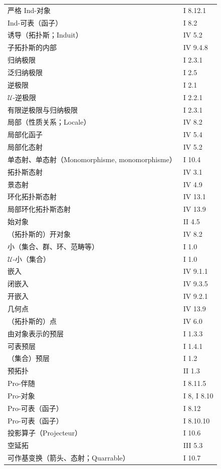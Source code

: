 \begin{longtable}{@{}p{}p{}@{}}
严格 Ind-对象 & I 8.12.1\\
Ind-可表（函子） & I 8.2\\
诱导（拓扑斯；Induit） & IV 5.2\\
子拓扑斯的内部 & IV 9.4.8\\[3pt]
归纳极限 & I 2.3.1\\
泛归纳极限 & I 2.5\\
逆极限 & I 2.1\\
$\mathcal U$-逆极限 & I 2.2.1\\
有限逆极限与归纳极限 & I 2.3.1\\
局部（性质关系；Locale） & IV 8.2\\
局部化函子 & IV 5.4\\
局部化态射 & IV 5.2\\
单态射、单态射（Monomorphisme, monomorphisme） & I 10.4\\
拓扑斯态射 & IV 3.1\\
景态射 & IV 4.9\\
环化拓扑斯态射 & IV 13.1\\
局部环化拓扑斯态射 & IV 13.9\\[3pt]
始对象 & II 4.5\\
（拓扑斯的）开对象 & IV 8.2\\[3pt]
小（集合、群、环、范畴等） & I 1.0\\
$\mathcal U$-小（集合） & I 1.0\\
嵌入 & IV 9.1.1\\
闭嵌入 & IV 9.3.5\\
开嵌入 & IV 9.2.1\\
几何点 & IV 13.9\\
（拓扑斯的）点 & IV 6.0\\
由对象表示的预层 & I 1.3.3\\
可表预层 & I 1.4.1\\
（集合）预层 & I 1.2\\
预拓扑 & II 1.3\\
Pro-伴随 & I 8.11.5\\
Pro-对象 & I 8, I 8.10\\
Pro-可表（函子） & I 8.12\\
Pro-可表（函子） & I 8.10.10\\
投影算子（Projecteur） & I 10.6\\
空延拓 & III 5.3\\
可作基变换（箭头、态射；Quarrable） & I 10.7\\
\end{longtable}

